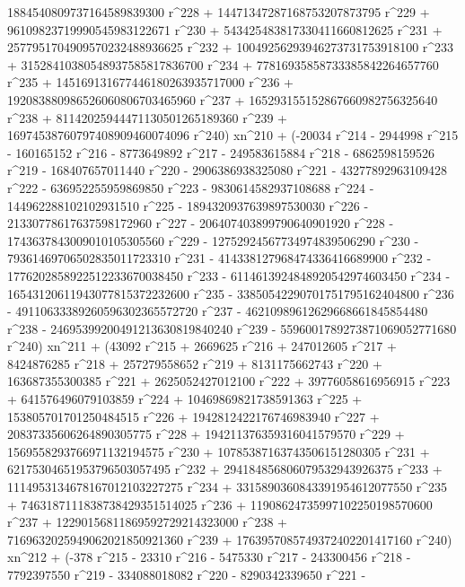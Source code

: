        1884540809737164589839300 r^228 + 
       14471347287168753207873795 r^229 + 
       96109823719990545983122671 r^230 + 
       543425483817330411660812625 r^231 + 
       2577951704909570232488936625 r^232 + 
       10049256293946273731753918100 r^233 + 
       31528410380548937585817836700 r^234 + 
       77816935858733385842264657760 r^235 + 
       145169131677446180263935717000 r^236 + 
       192083880986526060806703465960 r^237 + 
       165293155152867660982756325640 r^238 + 
       81142025944471130501265189360 r^239 + 
       16974538760797408909460074096 r^240) xn^210 + (-20034 r^214 - 
       2944998 r^215 - 160165152 r^216 - 8773649892 r^217 - 
       249583615884 r^218 - 6862598159526 r^219 - 
       168407657011440 r^220 - 2906386938325080 r^221 - 
       43277892963109428 r^222 - 636952255959869850 r^223 - 
       9830614582937108688 r^224 - 144962288102102931510 r^225 - 
       1894320937639897530030 r^226 - 21330778617637598172960 r^227 - 
       206407403899790640901920 r^228 - 
       1743637843009010105305560 r^229 - 
       12752924567734974839506290 r^230 - 
       79361469706502835011723310 r^231 - 
       414338127968474336416689900 r^232 - 
       1776202858922512233670038450 r^233 - 
       6114613924848920542974603450 r^234 - 
       16543120611943077815372232600 r^235 - 
       33850542290701751795162404800 r^236 - 
       49110633389260596302365572720 r^237 - 
       46210989612629668661845854480 r^238 - 
       24695399200491213630819840240 r^239 - 
       5596001789273871069052771680 r^240) xn^211 + (43092 r^215 + 
       2669625 r^216 + 247012605 r^217 + 8424876285 r^218 + 
       257279558652 r^219 + 8131175662743 r^220 + 
       163687355300385 r^221 + 2625052427012100 r^222 + 
       39776058616956915 r^223 + 641576496079103859 r^224 + 
       10469869821738591363 r^225 + 153805701701250484515 r^226 + 
       1942812422176746983940 r^227 + 20837335606264890305775 r^228 + 
       194211376359316041579570 r^229 + 
       1569558293766971132194575 r^230 + 
       10785387163743506151280305 r^231 + 
       62175304651953796503057495 r^232 + 
       294184856806079532943926375 r^233 + 
       1114953134678167012103227275 r^234 + 
       3315890360843391954612077550 r^235 + 
       7463187111838738429351514025 r^236 + 
       11908624735997102250198570600 r^237 + 
       12290156811869592729214323000 r^238 + 
       7169632025949062021850921360 r^239 + 
       1763957085749372402201417160 r^240) xn^212 + (-378 r^215 - 
       23310 r^216 - 5475330 r^217 - 243300456 r^218 - 
       7792397550 r^219 - 334088018082 r^220 - 8290342339650 r^221 - 
